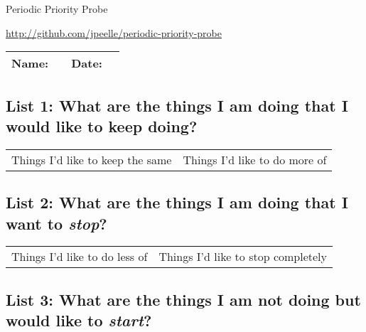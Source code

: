 \documentclass[letterpaper,oneside,11pt,article, portrait]{memoir}
\begin{document}
\pagestyle{empty}


\begin{centering}

{\Large Periodic Priority Probe}

\small{\url{http://github.com/jpeelle/periodic-priority-probe}}

\end{centering}

\vspace{.2in}

\noindent \begin{tabularx}{\textwidth}{ l X l X}
Name:& &Date:& \\
\hline
\end{tabularx}

\vspace{.2in}


\subsection{List 1: What are the things I am doing that I would like to keep doing?}

\begin{tabularx}{\textwidth}{>{\centering\small}X | >{\centering\small}X}
Things I'd like to keep the same& Things I'd like to do more of\\
\end{tabularx}


\vspace{1.3in}

\subsection{List 2: What are the things I am doing that I want to {\itshape stop}?}

\begin{tabularx}{\textwidth}{>{\centering\small}X | >{\centering\small}X}
Things I'd like to do less of& Things I'd like to stop completely\\
\end{tabularx}

\vspace{1.3in}

\subsection{List 3: What are the things I am not doing but would like to {\itshape start}?}
\vspace{.75in} %
\end{document}
